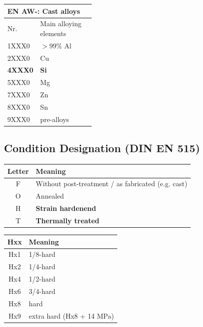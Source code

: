 \documentclass{article}
\begin{document}
\begin{table}[ht!]
\begin{minipage}[t]{0.31\textwidth}
\begin{tabular}{|l|l|l|}
      \multicolumn{2}{|l|}{\color{red}EN AW-: Cast alloys} \\
      \hline
      Nr. & \thead{Main alloying\\elements}\\
      \hline
      1XXX0 & $>$99\% Al\\
      \hline
      2XXX0 & Cu\\
      \hline
      \textbf{4XXX0} & \textbf{Si}\\
      \hline
      5XXX0 & Mg\\
      \hline
      7XXX0 & Zn\\
      \hline
      8XXX0 & Sn\\
      \hline
      9XXX0 & pre-alloys\\
      \hline
    \end{tabular}
  \end{minipage}
\end{table}

\subsection{Condition Designation (DIN EN 515)}
\begin{table}[ht!]
  \begin{minipage}[t]{0.58\textwidth}
    \centering
    \begin{tabular}{|c|l|}
      \hline
      \textbf{Letter} & \textbf{Meaning}\\
      \hline
      F & Without post-treatment / as fabricated (e.g. cast)\\
      \hline
      O & Annealed\\
      \hline
      H & \textbf{Strain hardenend}\\
      \hline
      T & \textbf{Thermally treated}\\
      \hline
    \end{tabular}
  \end{minipage}
  \hfill
  \begin{minipage}[t]{0.38\textwidth}
    \centering
    \begin{tabular}{|c|l|}
      \hline
      \textbf{Hxx} & \textbf{Meaning}\\
      \hline
      Hx1 & 1/8-hard\\
      \hline
      Hx2 & 1/4-hard\\
      \hline
      Hx4 & 1/2-hard\\
      \hline
      Hx6 & 3/4-hard\\
      \hline
      Hx8 & hard\\
      \hline
      Hx9 & extra hard (Hx8 + 14 MPa)\\
      \hline
    \end{tabular}    
  \end{minipage}
\end{table}
\end{document}
